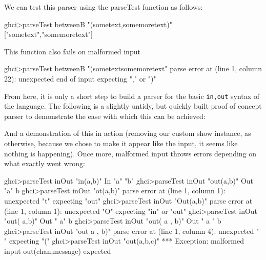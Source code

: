 We can test this parser using the parseTest function as follows:

\begin{code}
    ghci>parseTest betweenB "(sometext,somemoretext)"
    ["sometext","somemoretext"]
\end{code}

This function also fails on malformed input

\begin{code}
    ghci>parseTest betweenB "(sometextsomemoretext"
    parse error at (line 1, column 22):
    unexpected end of input
    expecting "," or ")"
\end{code}

From here, it is only a short step to build a parser for the basic \verb!in,out! syntax of the language. The following is a slightly untidy, but quickly built proof of concept parser to demonstrate the ease with which this can be achieved:


And a demonstration of this in action (removing our custom show instance, as otherwise, because we chose to make it appear like the input, it seems like nothing is happening). Once more, malformed input throws errors depending on what exactly went wrong: 
\begin{code}
    ghci>parseTest inOut "in(a,b)"
    In "a" "b"
    ghci>parseTest inOut "out(a,b)"
    Out "a" b
    ghci>parseTest inOut "ot(a,b)"
    parse error at (line 1, column 1):
    unexpected "t"
    expecting "out"
    ghci>parseTest inOut "Out(a,b)"
    parse error at (line 1, column 1):
    unexpected "O"
    expecting "in" or "out"
    ghci>parseTest inOut "out( a,b)"
    Out " a" b
    ghci>parseTest inOut "out( a ,      b)"
    Out " a "       b
    ghci>parseTest inOut "out  a ,      b)"
    parse error at (line 1, column 4):
    unexpected " "
    expecting "("
    ghci>parseTest inOut "out(a,b,c)"
    *** Exception: malformed input out(chan,message) expected
\end{code}

